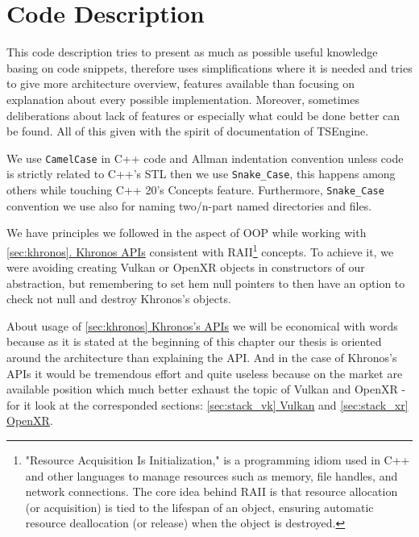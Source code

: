 \newpage
\section{Code Description}
\label{sec:code_descr}
This code description tries to present as much as possible useful knowledge basing on code snippets, therefore uses simplifications where it is needed and tries to give more architecture overview, features available than focusing on explanation about every possible implementation. Moreover, sometimes deliberations about lack of features or especially what could be done better can be found. All of this given with the spirit of documentation of TSEngine.

We use \texttt{CamelCase} in C++ code and Allman indentation convention unless code is strictly related to C++'s STL then we use \texttt{Snake\_Case}, this happens among others while touching C++ 20's Concepts feature.
Furthermore, \texttt{Snake\_Case} convention we use also for naming two/n-part named directories and files.

We have principles we followed in the aspect of OOP while working with \hyperref[sec:khronos]{\ref*{sec:khronos}. Khronos APIs} consistent with RAII\footnote{"Resource Acquisition Is Initialization," is a programming idiom used in C++ and other languages to manage resources such as memory, file handles, and network connections. The core idea behind RAII is that resource allocation (or acquisition) is tied to the lifespan of an object, ensuring automatic resource deallocation (or release) when the object is destroyed.} concepts. To achieve it, we were avoiding creating Vulkan or OpenXR objects in constructors of our abstraction, but remembering to set hem null pointers to then have an option to check not null and destroy Khronos's objects.

About usage of \hyperref[sec:khronos]{\ref*{sec:khronos} Khronos's APIs} we will be economical with words because as it is stated at the beginning of this chapter our thesis is oriented around the architecture than explaining the API. And in the case of Khronos's APIs it would be tremendous effort and quite useless because on the market are available position which much better exhaust the topic of Vulkan and OpenXR - for it look at the corresponded sections: \hyperref[sec:stack_vk]{\ref*{sec:stack_vk} Vulkan} and \hyperref[sec:stack_xr]{\ref*{sec:stack_xr} OpenXR}.

